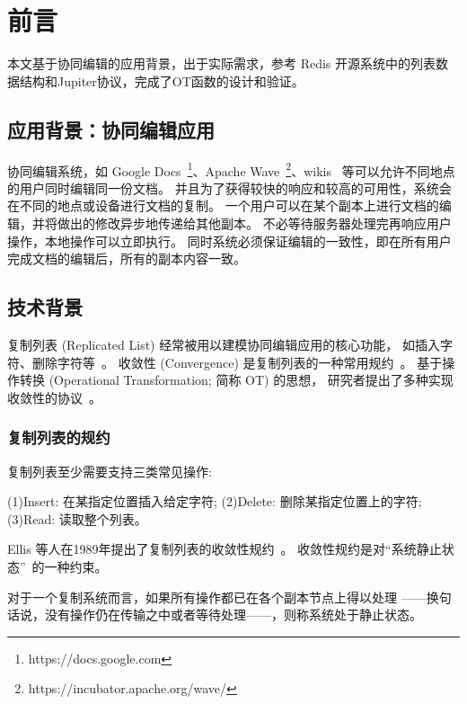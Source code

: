 \chapter{前言}
本文基于协同编辑的应用背景，出于实际需求，参考 Redis 开源系统中的列表数据结构和Jupiter协议，完成了OT函数的设计和验证。
\section{应用背景：协同编辑应用}

协同编辑系统，如 Google Docs~\footnote{https://docs.google.com}、Apache Wave~\footnote{https://incubator.apache.org/wave/}、wikis~\cite{Leuf:Wiki01} 
等可以允许不同地点的用户同时编辑同一份文档。
并且为了获得较快的响应和较高的可用性，系统会在不同的地点或设备进行文档的复制。
一个用户可以在某个副本上进行文档的编辑，并将做出的修改异步地传递给其他副本。
不必等待服务器处理完再响应用户操作，本地操作可以立即执行。
同时系统必须保证编辑的一致性，即在所有用户完成文档的编辑后，所有的副本内容一致。

\section{技术背景}

复制列表 (Replicated List) 经常被用以建模协同编辑应用的核心功能，
如插入字符、删除字符等~\cite{Ellis:SIGMOD89, Nichols:UIST95, Attiya:PODC16}。
收敛性 (Convergence) 是复制列表的一种常用规约~\cite{Ellis:SIGMOD89}。
基于操作转换 (Operational Transformation; 简称 OT) 的思想，
研究者提出了多种实现收敛性的协议~\cite{Ellis:SIGMOD89, Prakash:TOCHI94, Nichols:UIST95, Sun:TOCHI98, Sun:CSCW98, 
Vidot:CSCW00, Shen:CSCW02, Sun:TOCHI02, Li:ICPADS04, Sun:TPDS09, Sun:CSCW14}。

\subsection{复制列表的规约}
复制列表至少需要支持三类常见操作: 

(1)Insert: 在某指定位置插入给定字符;
(2)Delete: 删除某指定位置上的字符;
(3)Read: 读取整个列表。


Ellis 等人在1989年提出了复制列表的收敛性规约~\cite{Ellis:SIGMOD89}。
收敛性规约是对``系统静止状态''~\cite{Ellis:SIGMOD89}的一种约束。
\begin{definition}
  对于一个复制系统而言，如果所有操作都已在各个副本节点上得以处理
  ——换句话说，没有操作仍在传输之中或者等待处理——，则称系统处于静止状态。
\end{definition}

